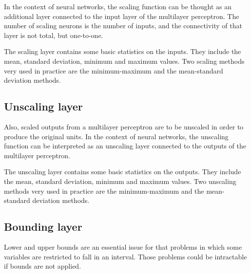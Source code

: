 In the context of neural networks, the scaling function can be thought as an additional layer connected to the input layer of the multilayer perceptron. The number of scaling neurons is the number of inputs, and the connectivity of that layer is not total, but one-to-one. 



The scaling layer contains some basic statistics on the inputs. They include the mean, standard deviation, minimum and maximum values.
Two scaling methods very used in practice are the minimum-maximum and the mean-standard deviation methods. 

\subsection*{Unscaling layer}

Also, scaled outputs from a multilayer perceptron are to be unscaled in order to produce the original units.
In the context of neural networks, the unscaling function can be interpreted as an unscaling layer connected to the outputs of the multilayer perceptron. 


The unscaling layer contains some basic statistics on the outputs. They include the mean, standard deviation, minimum and maximum values. 
Two unscaling methods very used in practice are the minimum-maximum and the mean-standard deviation methods. 

\subsection*{Bounding layer}

Lower and upper bounds are an essential issue for that problems in which some variables are restricted to fall in an interval. Those problems could be intractable if bounds are not applied. 

